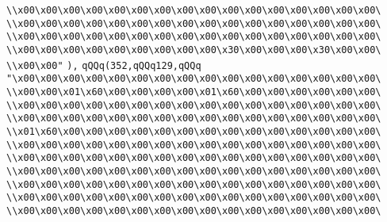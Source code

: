\verb|\\x00\x00\x00\x00\x00\x00\x00\x00\x00\x00\x00\x00\x00\x00\x00\x00\|\newline
\verb|\\x00\x00\x00\x00\x00\x00\x00\x00\x00\x00\x00\x00\x00\x00\x00\x00\|\newline
\verb|\\x00\x00\x00\x00\x00\x00\x00\x00\x00\x00\x00\x00\x00\x00\x00\x00\|\newline
\verb|\\x00\x00\x00\x00\x00\x00\x00\x00\x00\x30\x00\x00\x00\x30\x00\x00\|\newline
\verb|\\x00\x00"|\newline
\verb|),|\newline
\verb|qQQq(352,qQQq129,qQQq|\newline
\verb|"\x00\x00\x00\x00\x00\x00\x00\x00\x00\x00\x00\x00\x00\x00\x00\x00\|\newline
\verb|\\x00\x00\x01\x60\x00\x00\x00\x00\x01\x60\x00\x00\x00\x00\x00\x00\|\newline
\verb|\\x00\x00\x00\x00\x00\x00\x00\x00\x00\x00\x00\x00\x00\x00\x00\x00\|\newline
\verb|\\x00\x00\x00\x00\x00\x00\x00\x00\x00\x00\x00\x00\x00\x00\x00\x00\|\newline
\verb|\\x01\x60\x00\x00\x00\x00\x00\x00\x00\x00\x00\x00\x00\x00\x00\x00\|\newline
\verb|\\x00\x00\x00\x00\x00\x00\x00\x00\x00\x00\x00\x00\x00\x00\x00\x00\|\newline
\verb|\\x00\x00\x00\x00\x00\x00\x00\x00\x00\x00\x00\x00\x00\x00\x00\x00\|\newline
\verb|\\x00\x00\x00\x00\x00\x00\x00\x00\x00\x00\x00\x00\x00\x00\x00\x00\|\newline
\verb|\\x00\x00\x00\x00\x00\x00\x00\x00\x00\x00\x00\x00\x00\x00\x00\x00\|\newline
\verb|\\x00\x00\x00\x00\x00\x00\x00\x00\x00\x00\x00\x00\x00\x00\x00\x00\|\newline
\verb|\\x00\x00\x00\x00\x00\x00\x00\x00\x00\x00\x00\x00\x00\x00\x00\x00\|\newline

